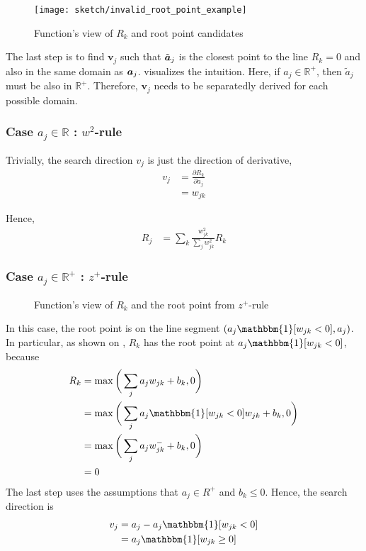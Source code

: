 \begin{figure}[!hbt]
\centering
\texttt{[image: sketch/invalid\_root\_point\_example]}
\caption{Function's view of $R_k$  and root point candidates}
\label{fig:root_point_illus}
\end{figure}



The last step is to find $\boldsymbol{v}_j$ such that $\tilde{\patvector{a}}_j$ is the closest point to the line $R_k=0$ and also in the same domain as $\patvector{a}_j$. \addfigure{\ref{fig:root_point_illus}} visualizes the intuition. Here, if $a_j \in \mathbb{R}^+$, then $\tilde{a}_j$ must be also in $\mathbb{R}^+$. Therefore, $\boldsymbol{v}_j$ needs to be separatedly derived for each possible domain.

\subsubsection{Case $a_j \in \mathbb{R}$ : $w^2$-rule}

Trivially, the search direction $v_j$ is just the direction of derivative,
\begin{align}
	v_j &= \frac{\partial R_k}{ \partial a_j } \\
	&= w_{jk}
\end{align}

Hence, 
\begin{align}
	R_j &=	\sum_k \frac{ w_{jk}^2  }{\sum_{j} w_{jk}^2}  R_k
\end{align}

\subsubsection{Case $a_j \in \mathbb{R}^+$ : $z^+$-rule}
\begin{figure}[!htb]
\centering
{}
\caption{Function's view of $R_k$ and the root point from $z^+$-rule}
\label{fig:zplus_rule_cases}
\end{figure}
In this case, the root point is on the line segment $( a_j \mathbbm{1}[ w_{jk}  < 0 ], a_j )$. In particular, as shown on \addfigure{\ref{fig:zplus_rule_cases}}, $R_k$ has the root point at $a_j \mathbbm{1}[w_{jk}  < 0 ]$, because 
\begin{align}	
R_k &= \max \bigg( \sum_j a_j w_{jk } + b_k, 0 \bigg) \\
&=  \max \bigg( \sum_j a_j \mathbbm{1}[ w_{jk}  < 0 ] w_{jk} + b_k, 0 \bigg) \\
&=  \max \bigg(\sum_j a_j  w_{jk}^- + b_k , 0\bigg) \\
&= 0 \label{eq:zplus_rk_zero}
\end{align}
The last step uses the assumptions that $a_j \in R^+$ and $b_k \le 0$. Hence, the search direction is 
\begin{align}
	v_j &= a_j - a_j \mathbbm{1}[ w_{jk}  < 0 ] \\
	&= a_j \mathbbm{1}[ w_{jk}  \ge 0 ]
\end{align}

